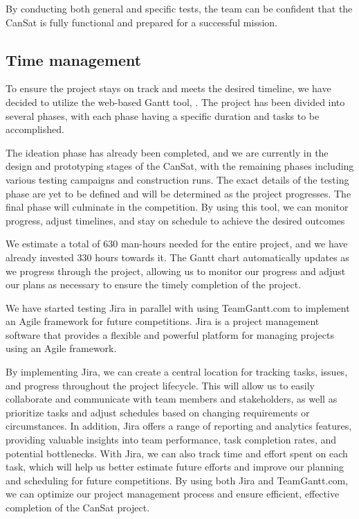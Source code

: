 \documentclass[11pt]{article}
\begin{document}
By conducting both general and specific tests, the team can be confident that the CanSat is fully functional and prepared for a successful mission.


\subsection{Time management}
To ensure the project stays on track and meets the desired timeline, we have decided to utilize the web-based Gantt tool, \href{https://app.teamgantt.com/}{\color{CDOSRPrimary}{TeamGantt.com}}. The project has been divided into several phases, with each phase having a specific duration and tasks to be accomplished.

The ideation phase has already been completed, and we are currently in the design and prototyping stages of the CanSat, with the remaining phases including various testing campaigns and construction runs. The exact details of the testing phase are yet to be defined and will be determined as the project progresses. The final phase will culminate in the competition. By using this tool, we can monitor progress, adjust timelines, and stay on schedule to achieve the desired outcomes

We estimate a total of 630 man-hours needed for the entire project, and we have already invested 330 hours towards it. The Gantt chart automatically updates as we progress through the project, allowing us to monitor our progress and adjust our plans as necessary to ensure the timely completion of the project.

We have started testing Jira in parallel with using TeamGantt.com to implement an Agile framework for future competitions. Jira is a project management software that provides a flexible and powerful platform for managing projects using an Agile framework. 

By implementing Jira, we can create a central location for tracking tasks, issues, and progress throughout the project lifecycle. This will allow us to easily collaborate and communicate with team members and stakeholders, as well as prioritize tasks and adjust schedules based on changing requirements or circumstances. In addition, Jira offers a range of reporting and analytics features, providing valuable insights into team performance, task completion rates, and potential bottlenecks. With Jira, we can also track time and effort spent on each task, which will help us better estimate future efforts and improve our planning and scheduling for future competitions. By using both Jira and TeamGantt.com, we can optimize our project management process and ensure efficient, effective completion of the CanSat project.
\end{document}
